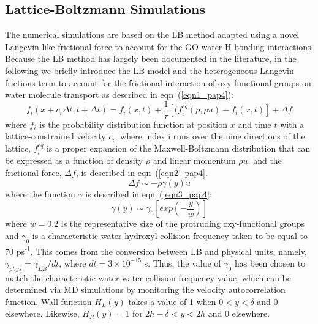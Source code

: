 \subsection{Lattice-Boltzmann Simulations}
The numerical simulations are based on the LB method adapted using a novel Langevin-like frictional force to account for the GO-water H-bonding interactions. Because the LB method has largely been documented in the literature,\cite{aidun2010lattice,succi2001lattice} in the following we briefly introduce the LB model and the heterogeneous Langevin frictions term to account for the frictional interaction of oxy-functional groups on water molecule transport as described in eqn~(\ref{eqn1_pap4}): 
\begin{equation}
f_i(x+c_i\Delta t,t+\Delta t) = f_i(x,t)+\dfrac{1}{\tau}[(f_i^{eq}(\rho, \rho u)-f_i(x,t)] + \Delta f 
 \label{eqn1_pap4}
\end{equation}
where $f_i$ is the probability distribution function at position $x$ and time $t$ with a lattice-constrained velocity $c_i$, where index i runs over the nine directions of the lattice, $f_i^{eq}$ is a proper expansion of the Maxwell-Boltzmann distribution that can be expressed as a function of density $\rho$ and linear momentum $\rho u$, and the frictional force, $\Delta f$, is described in eqn~(\ref{eqn2_pap4}.
\begin{equation}
\Delta f \sim -\rho \gamma (y)u 
 \label{eqn2_pap4}
\end{equation}
where the function $\gamma$ is described in eqn~(\ref{eqn3_pap4}:
\begin{equation}
\gamma (y) \sim \gamma_0 [exp(-\dfrac{y}{w})]
 \label{eqn3_pap4}
\end{equation}
where $w=0.2$ is the representative size of the protruding oxy-functional groups and $\gamma_0$ is a characteristic water-hydroxyl collision frequency taken to be equal to 70 ps\textsuperscript{-1}.\cite{pastor1988analysis} This comes from the conversion between LB and physical units, namely, $\gamma_{phys}=\gamma_{LB}/dt$, where $dt=3\times10^{-15}$ s. Thus, the value of $\gamma_0$ has been chosen to match the characteristic water-water collision frequency value, which can be determined via MD simulations by monitoring the velocity autocorrelation function.\cite{pastor1988analysis} Wall function $H_L(y)$ takes a value of 1 when $0<y<\delta$ and 0 elsewhere. Likewise, $H_R(y)=1$ for $2h−δ<y<2h$ and 0 elsewhere.\\
